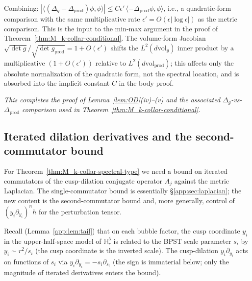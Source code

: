 \documentclass[11pt,letterpaper]{article}
\theoremstyle{definition}
\newcommand{\bbH}{\mathbb{H}}
\newcommand{\Lap}{\Delta}
\begin{document}
Combining: $|\langle(\Lap_g - \Lap_{\mathrm{prod}})\phi,\phi\rangle| \le C\epsilon'\,\langle-\Lap_{\mathrm{prod}}\phi,\phi\rangle$, i.e., a quadratic-form comparison with the same multiplicative rate $\epsilon' = O(\epsilon|\log\epsilon|)$ as the metric comparison. This is the input to the min-max argument in the proof of Theorem~\ref{thm:M_k-collar-conditional}. The volume-form Jacobian $\sqrt{\det g}/\sqrt{\det g_{\mathrm{prod}}} = 1 + O(\epsilon')$ shifts the $L^2(d\mathrm{vol}_g)$ inner product by a multiplicative $(1+O(\epsilon'))$ relative to $L^2(d\mathrm{vol}_{\mathrm{prod}})$; this affects only the absolute normalization of the quadratic form, not the spectral location, and is absorbed into the implicit constant $C$ in the body proof.

\medskip

\noindent\textit{This completes the proof of Lemma~\ref{lem:OD}(iv)--(v) and the associated $\Lap_g$-vs-$\Lap_{\mathrm{prod}}$ comparison used in Theorem~\ref{thm:M_k-collar-conditional}.}

\subsection{Iterated dilation derivatives and the second-commutator bound}\label{app:sec:iterated}

For Theorem~\ref{thm:M_k-collar-spectral-type} we need a bound on iterated commutators of the cusp-dilation conjugate operator $A_j$ against the metric Laplacian. The single-commutator bound is essentially \S\ref{app:sec:laplacian}; the new content is the second-commutator bound and, more generally, control of $(y_i\partial_{y_i})^n h$ for the perturbation tensor.

Recall (Lemma~\ref{app:lem:tail}) that on each bubble factor, the cusp coordinate $y_i$ in the upper-half-space model of $\bbH^5_r$ is related to the BPST scale parameter $s_i$ by $y_i \sim r^2/s_i$ (the cusp coordinate is the inverted scale). The cusp-dilation $y_i\partial_{y_i}$ acts on functions of $s_i$ via $y_i\partial_{y_i} = -s_i\partial_{s_i}$ (the sign is immaterial below; only the magnitude of iterated derivatives enters the bound).
\end{document}
